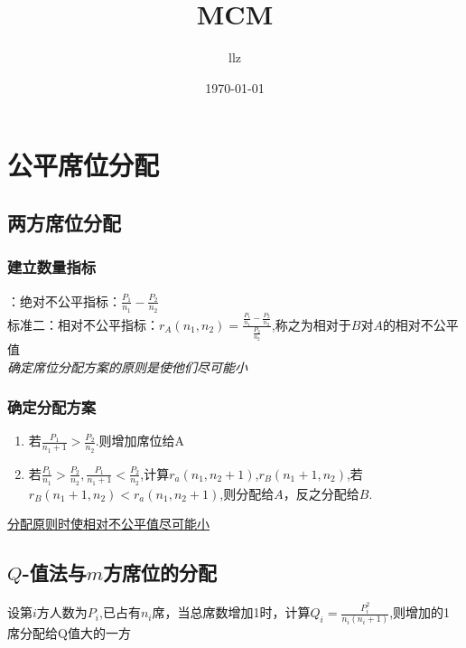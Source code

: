 \documentclass[12pt,a4paper]{article}
\title{MCM}
\author{llz}
\date{\today}
\begin{document}
\kaishu
\maketitle

\section{公平席位分配}
\subsection{两方席位分配}
\subsubsection{建立数量指标}
：绝对不公平指标：$\frac{P_1}{n_1}-\frac{P_2}{n_2}$\\
标准二：相对不公平指标：$r_A(n_1,n_2)=\frac{\frac{P_1}{n_1}-\frac{P_2}{n_2}}{\frac{P_2}{n_2}}$,称之为相对于$B$对$A$的相对不公平值\\
\emph{确定席位分配方案的原则是使他们尽可能小}

\subsubsection{确定分配方案}
\begin{enumerate}
\item 若$\frac{P_1}{n_1+1}>\frac{P_2}{n_2}$.则增加席位给A
\item 若$\frac{P_1}{n_1}>\frac{P_2}{n_2},\frac{P_1}{n_1+1}<\frac{P_2}{n_2}$,计算$r_a(n_1,n_2+1)$,$r_B(n_1+1,n_2)$,若$r_B(n_1+1,n_2)<r_a(n_1,n_2+1)$,则分配给$A$，反之分配给$B$.
\end{enumerate}
\underline{分配原则时使相对不公平值尽可能小}

\subsection{$Q$-值法与$m$方席位的分配}
设第$i$方人数为$P_i$,已占有$n_i$席，当总席数增加1时，计算$Q_i=\frac{P_i^2}{n_i(n_i+1)}$,则增加的1席分配给Q值大的一方
\end{document}
